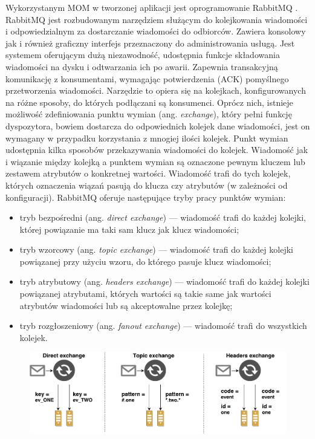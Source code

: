 \documentclass[a4paper]{book}
\newcommand{\obcy}[2]{{\selectlanguage{#1}#2}}
\newcommand{\ang}[1]{\emph{\obcy{british}{#1}}}
\begin{document}
{Wykorzystanym MOM w tworzonej aplikacji jest oprogramowanie RabbitMQ \cite{id:RabbitMQ}. RabbitMQ jest rozbudowanym narzędziem służącym do kolejkowania wiadomości i odpowiedzialnym za dostarczanie wiadomości do odbiorców. Zawiera konsolowy jak i również graficzny interfejs przeznaczony do administrowania usługą. Jest systemem oferującym dużą niezawodność, udostępnia funkcje składowania wiadomości na dysku i odtwarzania ich po awarii. Zapewnia transakcyjną komunikację z konsumentami, wymagając potwierdzenia (ACK) pomyślnego przetworzenia wiadomości. Narzędzie to opiera się na kolejkach, konfigurowanych na różne sposoby, do których podłączani są konsumenci.  Oprócz nich, istnieje możliwość zdefiniowania punktu wymian (ang. \ang{exchange}), który pełni funkcję dyspozytora, bowiem dostarcza do odpowiednich kolejek dane wiadomości, jest on wymagany w przypadku korzystania z mnogiej ilości kolejek. Punkt wymian udostępnia kilka sposobów przekazywania wiadomości do kolejek. Wiadomość jak i wiązanie między kolejką a punktem wymian są oznaczone pewnym kluczem lub zestawem atrybutów o konkretnej wartości. Wiadomość trafi do tych kolejek, których oznaczenia wiązań pasują do klucza czy atrybutów (w zależności od konfiguracji). RabbitMQ oferuje następujące tryby pracy punktów wymian:
\begin{itemize}
	\item tryb bezpośredni (ang. \ang{direct exchange}) --- wiadomość trafi do każdej kolejki, której powiązanie ma taki sam klucz jak klucz wiadomości;
	\item tryb wzorcowy (ang. \ang{topic exchange}) --- wiadomość trafi do każdej kolejki powiązanej przy użyciu wzoru, do którego pasuje klucz wiadomości;
	\item tryb atrybutowy (ang. \ang{headers exchange}) --- wiadomość trafi do każdej kolejki powiązanej atrybutami, których wartości są takie same jak wartości atrybutów wiadomości lub są akceptowalne przez kolejkę;
	\item tryb rozgłoszeniowy (ang. \ang{fanout exchange}) --- wiadomość trafi do wszystkich kolejek.
\end{itemize}
\begin{figure}
	\centering
	\includegraphics[width=1.0\textwidth]{./img/EDA_Kolejki.pdf}

\end{figure}}
\end{document}
